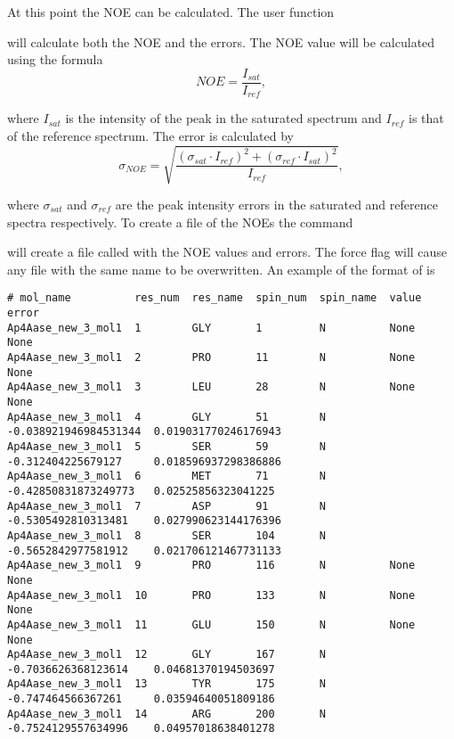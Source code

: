 At this point the NOE can be calculated.  The user function


will calculate both the NOE and the errors.  The NOE value will be calculated using the formula
\begin{equation}
NOE = \frac{I_{sat}}{I_{ref}},
\end{equation}

\noindent where $I_{sat}$ is the intensity of the peak in the saturated spectrum and $I_{ref}$ is that of the reference spectrum.  The error is calculated by
\begin{equation}
\sigma_{NOE} = \sqrt{\frac{(\sigma_{sat} \cdot I_{ref})^2 + (\sigma_{ref} \cdot I_{sat})^2}{I_{ref}}},
\end{equation}

\noindent where $\sigma_{sat}$ and $\sigma_{ref}$ are the peak intensity errors in the saturated and reference spectra respectively.  To create a file of the NOEs the command


will create a file called  with the NOE values and errors.  The force flag will cause any file with the same name to be overwritten.  An example of the format of  is

{\scriptsize \begin{verbatim}
# mol_name          res_num  res_name  spin_num  spin_name  value                  error                   
Ap4Aase_new_3_mol1  1        GLY       1         N          None                   None                    
Ap4Aase_new_3_mol1  2        PRO       11        N          None                   None                    
Ap4Aase_new_3_mol1  3        LEU       28        N          None                   None                    
Ap4Aase_new_3_mol1  4        GLY       51        N          -0.038921946984531344  0.019031770246176943    
Ap4Aase_new_3_mol1  5        SER       59        N          -0.312404225679127     0.018596937298386886    
Ap4Aase_new_3_mol1  6        MET       71        N          -0.42850831873249773   0.02525856323041225     
Ap4Aase_new_3_mol1  7        ASP       91        N          -0.5305492810313481    0.027990623144176396    
Ap4Aase_new_3_mol1  8        SER       104       N          -0.5652842977581912    0.021706121467731133    
Ap4Aase_new_3_mol1  9        PRO       116       N          None                   None                    
Ap4Aase_new_3_mol1  10       PRO       133       N          None                   None                    
Ap4Aase_new_3_mol1  11       GLU       150       N          None                   None                    
Ap4Aase_new_3_mol1  12       GLY       167       N          -0.7036626368123614    0.04681370194503697     
Ap4Aase_new_3_mol1  13       TYR       175       N          -0.747464566367261     0.03594640051809186     
Ap4Aase_new_3_mol1  14       ARG       200       N          -0.7524129557634996    0.04957018638401278     
\end{verbatim}}



